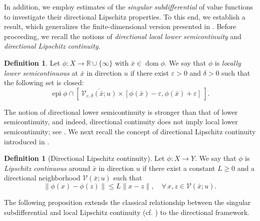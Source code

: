 \documentclass[12pt,twoside,reqno]{amsart}
\theoremstyle{definition}
\newtheorem{definition}[theorem]{Definition}
\numberwithin{equation}{section}
\begin{document}
In addition, we employ estimates of the \emph{singular subdifferential} of value functions to investigate their directional Lipschitz properties. 
To this end, we establish a result, which generalizes the finite-dimensional version presented in \cite[Proposition~2.3]{Bai2023Directional}. 
Before proceeding, we recall the notions of \emph{directional local lower semicontinuity} and \emph{directional Lipschitz continuity}.  

\begin{definition}
Let $\phi:X\to \mathbb{R}\cup\{\infty\}$ with $\bar x\in \operatorname{dom}\phi$. 
We say that $\phi$ is \emph{locally lower semicontinuous} at $\bar x$ in direction $u$ if there exist $\varepsilon>0$ and $\delta>0$ such that the following set is closed: 
\[
\operatorname{epi}\phi \cap [~ \overline{\mathcal{V}_{\varepsilon,\delta}(\bar x; u)} \times [\phi(\bar x)-\varepsilon,\phi(\bar x)+\varepsilon]~]. 
\]
\end{definition}

The notion of directional lower semicontinuity is stronger than that of lower semicontinuity, and indeed, directional continuity does not imply local lower semicontinuity; see \cite[Example~2.1]{Bai2023Directional}. 
We next recall the concept of directional Lipschitz continuity introduced in \cite{benko2019calculus}.

\begin{definition}[Directional Lipschitz continuity]
Let $\phi:X\rightarrow Y$. 
We say that $\phi$ is \emph{Lipschitz continuous} around $\bar x$ in direction $u$ if there exist a constant $L\geq 0$ and a directional neighborhood $\mathcal{V}(\bar x; u)$ such that 
\[
\|\phi(x)-\phi(z)\|\leq L\|x-z\|, \quad \forall\, x,z\in \mathcal{V}(\bar x;u).
\]
\end{definition}

The following proposition extends the classical relationship between the singular subdifferential and local Lipschitz continuity (cf. \cite[Theorem 3.52]{Mordukhovich2006variational}) to the directional framework. 
\end{document}
